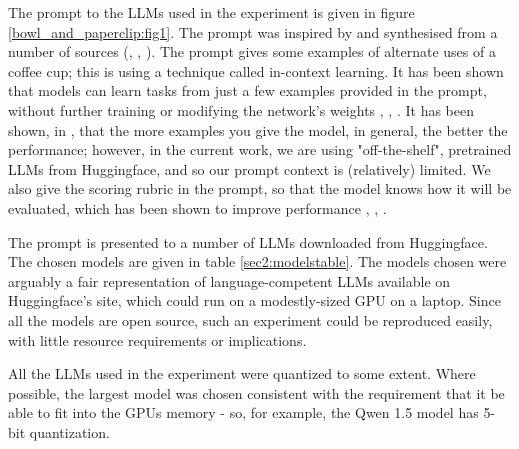 \documentclass{article}
\begin{document}
The prompt to the LLMs used in the experiment is given in figure \ref{bowl_and_paperclip:fig1}. The prompt was inspired by and synthesised from a number of sources (\cite{guilford1978alternate}, \cite{creativehuddle}, \cite{davebirss}). The prompt gives some examples of alternate uses of a coffee cup; this is using a technique called in-context learning. It has been shown that models can learn tasks from just a few examples provided in the prompt, without further training or modifying the network's weights \cite{brown2020languagemodelsfewshotlearners},    \cite{raventós2023pretrainingtaskdiversityemergence}, \cite{dong2024surveyincontextlearning}. It has been shown, in \cite{agarwal2024manyshotincontextlearning}, that the more examples you give the model, in general, the better the performance; however, in the current work, we are using "off-the-shelf", pretrained LLMs from Huggingface, and so our prompt context is (relatively) limited. We also give the scoring rubric in the prompt, so that the model knows how it will be evaluated, which has been shown to improve performance \cite{lee2024promptinglargelanguagemodels}, \cite{xiao2024humanaicollaborativeessayscoring},  \cite{zheng2023judgingllmasajudgemtbenchchatbot}. 

The prompt is presented to a number of LLMs downloaded from Huggingface. The chosen models are given in table \ref{sec2:modelstable}. The models chosen were arguably a fair representation of language-competent LLMs available on Huggingface's site, which could run on a modestly-sized GPU on a laptop. Since all the models are open source, such an experiment could be reproduced easily, with little resource requirements or implications.   

All the LLMs used in the experiment were quantized to some extent. Where possible, the largest model was chosen consistent with the requirement that it be able to fit into the GPUs memory - so, for example, the Qwen 1.5 model has 5-bit quantization.  
\end{document}
